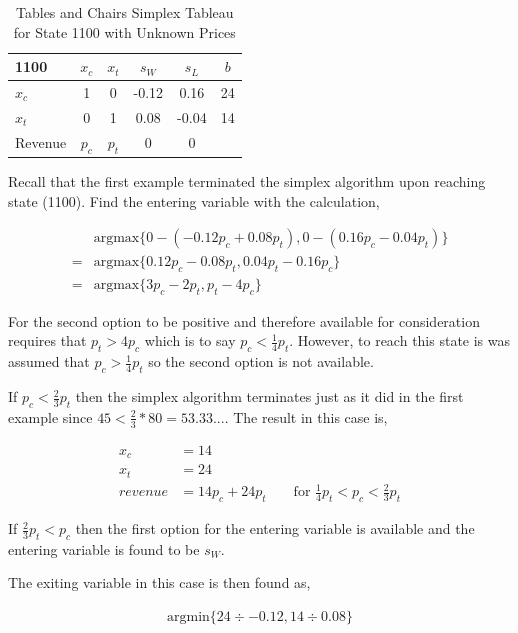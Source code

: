 \begin{table}
\centering
\begin{tabular}{| l | c c c c | c |}
\hline
1100    & $x_c$ & $x_t$ & $s_W$ & $s_L$ & $b$\\
\hline
$x_c$   & 1    & 0    & -0.12   & 0.16     & 24\\
$x_t$   & 0    & 1    & 0.08    & -0.04    & 14\\
\hline
Revenue & $p_c$ & $p_t$    & 0     & 0     &\\
\hline
\end{tabular}
  \caption[Tables and Chairs Simplex Tableau for State 1100 with Unknown Prices]
          {Tables and Chairs Simplex Tableau for State 1100 with Unknown Prices}
  \label{tab:tcp1100}
\end{table}

Recall that the first example terminated the simplex algorithm upon reaching state (1100). Find the entering variable with the calculation,

\begin{align*}
&\text{argmax}\{0 - (-0.12p_c + 0.08p_t), 0 - (0.16p_c - 0.04p_t)\}\\
= &\text{argmax}\{0.12p_c - 0.08p_t, 0.04p_t - 0.16p_c\}\\
= &\text{argmax}\{3p_c - 2p_t, p_t - 4p_c\}
\end{align*}

For the second option to be positive and therefore available for consideration requires that $p_t > 4p_c$ which is to say $p_c < \frac{1}{4}p_t$. However, to reach this state is was assumed that $p_c > \frac{1}{4}p_t$ so the second option is not available.

If $p_c < \frac{2}{3}p_t$ then the simplex algorithm terminates just as it did in the first example since $45 < \frac{2}{3}*80 = 53.33...$. The result in this case is,

\begin{align*}
x_c &= 14\\
x_t &= 24\\
revenue &= 14p_c + 24p_t && \text{ for } \frac{1}{4}p_t < p_c < \frac{2}{3}p_t
\end{align*}

If $\frac{2}{3}p_t < p_c$ then the first option for the entering variable is available and the entering variable is found to be $s_W$.

The exiting variable in this case is then found as,

\begin{align*}
\text{argmin}\{24 \div -0.12, 14 \div 0.08\}
\end{align*}

